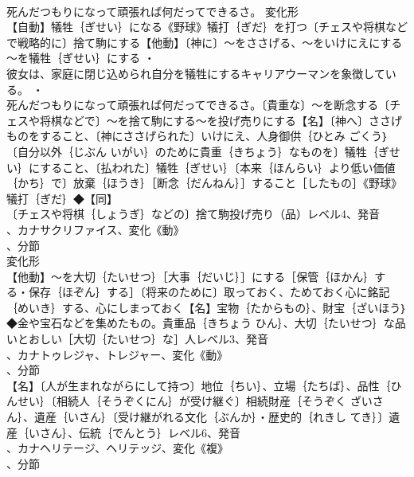 \documentclass[8pt]{extreport}
\begin{document}
\begin{CJK}{UTF8}{min}
\\	死んだつもりになって頑張れば何だってできるさ。	変化形 
\\	【自動】犠牲｛ぎせい｝になる《野球》犠打｛ぎだ｝を打つ〔チェスや将棋などで戦略的に〕捨て駒にする【他動】〔神に〕～をささげる、～をいけにえにする～を犠牲｛ぎせい｝にする ・
\\	彼女は、家庭に閉じ込められ自分を犠牲にするキャリアウーマンを象徴している。 ・
\\	死んだつもりになって頑張れば何だってできるさ。〔貴重な〕～を断念する〔チェスや将棋などで〕～を捨て駒にする～を投げ売りにする【名】〔神へ〕ささげものをすること、〔神にささげられた〕いけにえ、人身御供｛ひとみ ごくう｝〔自分以外｛じぶん いがい｝のために貴重｛きちょう｝なものを〕犠牲｛ぎせい｝にすること、〔払われた〕犠牲｛ぎせい｝〔本来｛ほんらい｝より低い価値｛かち｝で〕放棄｛ほうき｝［断念｛だんねん｝］すること［したもの］《野球》犠打｛ぎだ｝◆【同】
\\	〔チェスや将棋｛しょうぎ｝などの〕捨て駒投げ売り（品）レベル4、発音
\\	、カナサクリファイス、変化《動》
\\	、分節
\\	変化形 
\\	【他動】～を大切｛たいせつ｝［大事｛だいじ｝］にする［保管｛ほかん｝する・保存｛ほぞん｝する］〔将来のために〕取っておく、ためておく心に銘記｛めいき｝する、心にしまっておく【名】宝物｛たからもの｝、財宝｛ざいほう｝◆金や宝石などを集めたもの。貴重品｛きちょう ひん｝、大切｛たいせつ｝な品いとおしい［大切｛たいせつ｝な］人レベル3、発音
\\	、カナトゥレジャ、トレジャー、変化《動》
\\	、分節
\\	【名】〔人が生まれながらにして持つ〕地位｛ちい｝、立場｛たちば｝、品性｛ひんせい｝〔相続人｛そうぞくにん｝が受け継ぐ〕相続財産｛そうぞく ざいさん｝、遺産｛いさん｝〔受け継がれる文化｛ぶんか｝・歴史的｛れきし てき｝〕遺産｛いさん｝、伝統｛でんとう｝レベル6、発音
\\	、カナヘリテージ、ヘリテッジ、変化《複》
\\	、分節
\end{CJK}
\end{document}

